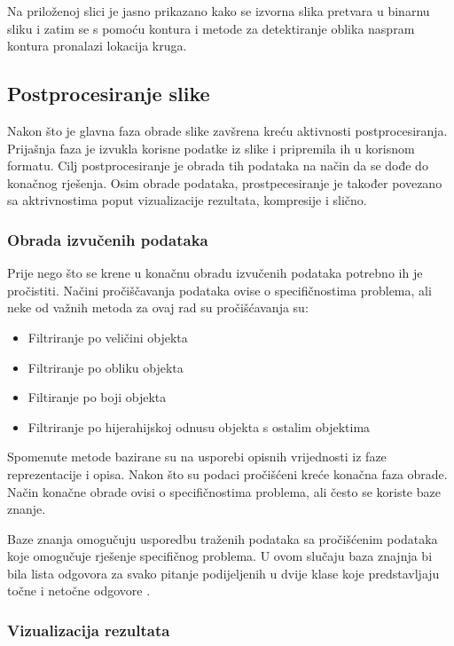 \documentclass{foi}
\begin{document}
Na priloženoj slici je jasno prikazano kako se izvorna slika pretvara u binarnu sliku i zatim se s pomoću kontura i metode za detektiranje oblika naspram kontura pronalazi lokacija kruga.

\subsection{Postprocesiranje slike}

Nakon što je glavna faza obrade slike zavšrena kreću aktivnosti postprocesiranja. Prijašnja faza je izvukla korisne podatke iz slike i pripremila ih u korisnom formatu. Cilj postprocesiranje je obrada tih podataka na način da se dođe do konačnog rješenja. Osim obrade podataka, prostpecesiranje je također povezano sa aktrivnostima poput vizualizacije rezultata, kompresije i slično.

\subsubsection{Obrada izvučenih podataka}

\begin{flushleft}
    Prije nego što se krene u konačnu obradu izvučenih podataka potrebno ih je pročistiti. Načini pročiščavanja podataka ovise o specifičnostima problema, ali neke od važnih metoda za ovaj rad su pročišćavanja su:
\begin{itemize}
    \item Filtriranje po veličini objekta
    \item Filtriranje po obliku objekta
    \item Filtiranje po boji objekta
    \item Filtriranje po hijerahijskoj odnusu objekta s ostalim objektima
\end{itemize}
\end{flushleft}

Spomenute metode bazirane su na usporebi opisnih vrijednosti iz faze reprezentacije i opisa. Nakon što su podaci pročišćeni kreće konačna faza obrade. Način konačne obrade ovisi o specifičnostima problema, ali često se koriste baze znanje.

Baze znanja omogučuju usporedbu traženih podataka sa pročišćenim podataka koje omogučuje rješenje specifičnog problema. U ovom slučaju baza znajnja bi bila lista odgovora za svako pitanje podijeljenih u dvije klase koje predstavljaju točne i netočne odgovore \cite{ImageProcessing}. 

\subsubsection{Vizualizacija rezultata}
\end{document}
